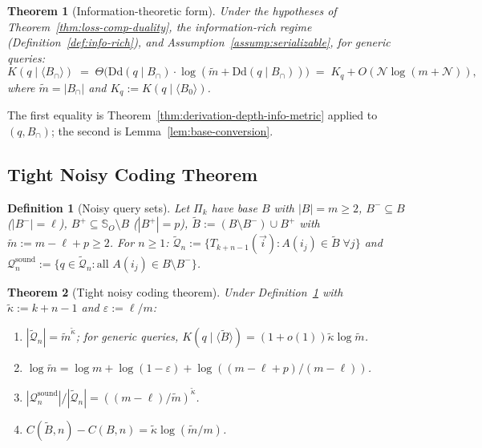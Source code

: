 \documentclass[journal]{IEEEtran}
\makeatletter
\newcommand{\Dd}{\text{Dd}}
\newtheorem{theorem}{Theorem}[section]
\newtheorem{definition}{Definition}[section]
\numberwithin{equation}{section}
\renewenvironment{proof}[1][\proofname]{\par
  \pushQED{\qed}%
  \normalfont \topsep6\p@\@plus6\p@\relax
  \trivlist
  \item[\hskip\labelsep
        \itshape
    #1\@addpunct{.}]\ignorespaces
}{%
  \popQED\endtrivlist\@endpefalse
}
\makeatother
\begin{document}
\begin{theorem}[Information-theoretic form]
\label{thm:loss-comp-info}
Under the hypotheses of Theorem~\ref{thm:loss-comp-duality},
the information-rich regime
\textup{(Definition~\ref{def:info-rich})}, and
Assumption~\ref{assump:serializable}, for generic queries:
\begin{equation}\label{eq:loss-comp-info}
  K(q\mid\langle B_\cap\rangle)
  \;=\;
  \Theta\!\bigl(\Dd(q\mid B_\cap)\cdot
    \log(\tilde m+\Dd(q\mid B_\cap))\bigr)
  \;=\;
  K_q+O(\mathcal N\log(m+\mathcal N)),
\end{equation}
where $\tilde m=|B_\cap|$ and
$K_q:=K(q\mid\langle B_0\rangle)$.
\end{theorem}

\begin{proof}
The first equality is
Theorem~\ref{thm:derivation-depth-info-metric} applied to
$(q,B_\cap)$; the second is Lemma~\ref{lem:base-conversion}.
\end{proof}

\subsection{Tight Noisy Coding Theorem}
\label{subsec:noisy-coding}

\begin{definition}[Noisy query sets]
\label{def:noisy-query-sets}
Let $\Pi_k$ have base $B$ with $|B|=m\ge 2$,
$B^-\subseteq B$ ($|B^-|=\ell$),
$B^+\subseteq\mathbb S_O\setminus B$ ($|B^+|=p$),
$\tilde B:=(B\setminus B^-)\cup B^+$ with
$\tilde m:=m-\ell+p\ge 2$.
For $n\ge 1$:
$\tilde{\mathcal{Q}}_n
 :=\{T_{k+n-1}(\vec i):A(i_j)\in\tilde B\;\forall j\}$
and
$\mathcal{Q}_n^{\mathrm{sound}}
 :=\{q\in\tilde{\mathcal{Q}}_n:
   \text{all }A(i_j)\in B\setminus B^-\}$.
\end{definition}

\begin{theorem}[Tight noisy coding theorem]
\label{thm:noisy-coding-combined}
Under Definition~\ref{def:noisy-query-sets} with
$\tilde\kappa:=k+n-1$ and $\varepsilon:=\ell/m$:

\begin{enumerate}[label=\textup{(\Roman*)}]
\item $|\tilde{\mathcal{Q}}_n|=\tilde m^{\tilde\kappa}$;
for generic queries,
$K(q\mid\langle\tilde B\rangle)
 =(1{+}o(1))\tilde\kappa\log\tilde m$.

\item $\log\tilde m
 =\log m+\log(1{-}\varepsilon)
  +\log((m{-}\ell{+}p)/(m{-}\ell))$.

\item $|\mathcal{Q}_n^{\mathrm{sound}}|
 /|\tilde{\mathcal{Q}}_n|
 =((m{-}\ell)/\tilde m)^{\tilde\kappa}$.

\item $C(\tilde B,n)-C(B,n)
 =\tilde\kappa\log(\tilde m/m)$.
\end{enumerate}
\end{theorem}
\end{document}

